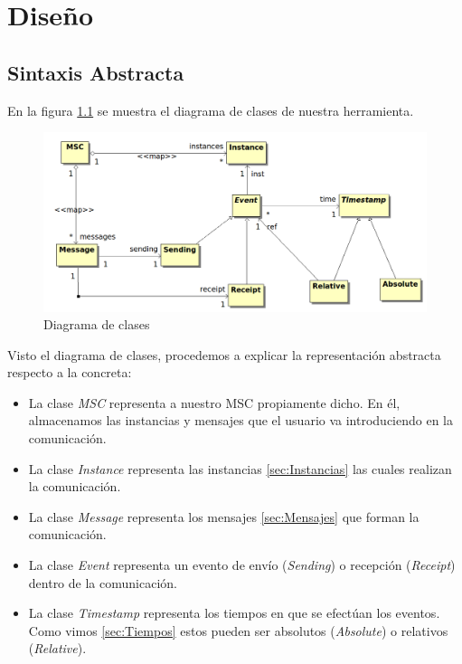 \chapter{Diseño}
\label{ch:diseno}

\section{Sintaxis Abstracta}

En la figura \ref{fig:modelo-ast} se muestra el diagrama de clases de
nuestra herramienta.

\begin{figure}
  \includegraphics[width=1.0\linewidth]{./images/modelo-ast}
  \caption{Diagrama de clases}
  \label{fig:modelo-ast}
\end{figure}

Visto el diagrama de clases, procedemos a explicar la representación
abstracta respecto a la concreta:
\begin{itemize}
\item La clase \textit{MSC} representa a nuestro MSC propiamente
  dicho. En él, almacenamos las instancias y mensajes que el usuario va
  introduciendo en la comunicación.
\item La clase \textit{Instance} representa las instancias
  \ref{sec:Instancias}  las cuales realizan la comunicación.
\item La clase \textit{Message} representa los mensajes
  \ref{sec:Mensajes} que forman la comunicación.
\item La clase \textit{Event} representa un evento de envío
  (\textit{Sending}) o recepción (\textit{Receipt}) dentro de la
  comunicación.
\item La clase \textit{Timestamp} representa los tiempos en que se
  efectúan los eventos. Como vimos \ref{sec:Tiempos} estos pueden ser
  absolutos (\textit{Absolute}) o relativos (\textit{Relative}).
\end{itemize}

